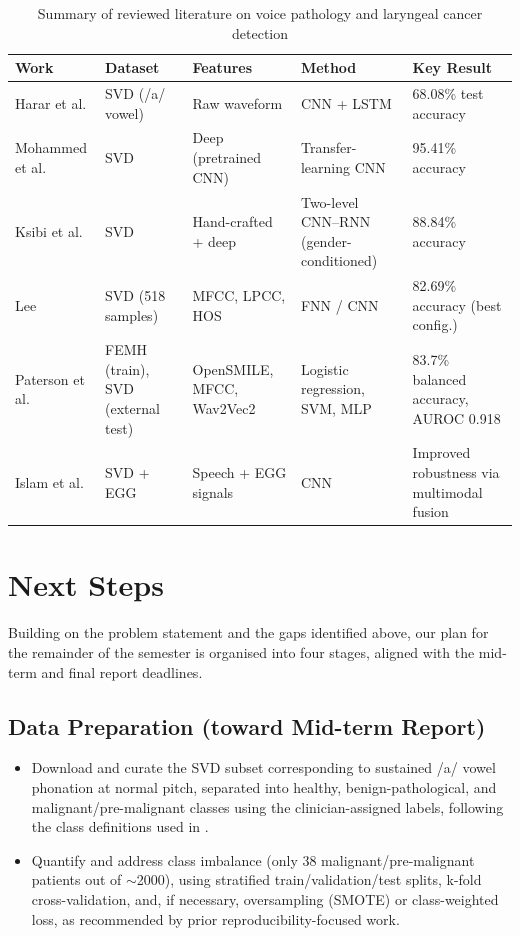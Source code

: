 \documentclass[conference]{IEEEtran}
\begin{document}
\begin{table}[t]
\centering
\caption{Summary of reviewed literature on voice pathology and laryngeal cancer detection}
\label{tab:litsummary}
\begin{tabular}{@{}p{2.6cm}p{2.6cm}p{3.4cm}p{4.4cm}p{2.6cm}@{}}
\toprule
\textbf{Work} & \textbf{Dataset} & \textbf{Features} & \textbf{Method} & \textbf{Key Result} \\
\midrule
Harar et al. \cite{harar2017} & SVD (/a/ vowel) & Raw waveform & CNN + LSTM & 68.08\% test accuracy \\
Mohammed et al. \cite{mohammed2020} & SVD & Deep (pretrained CNN) & Transfer-learning CNN & 95.41\% accuracy \\
Ksibi et al. \cite{ksibi2023} & SVD & Hand-crafted + deep & Two-level CNN--RNN (gender-conditioned) & 88.84\% accuracy \\
Lee \cite{lee2021} & SVD (518 samples) & MFCC, LPCC, HOS & FNN / CNN & 82.69\% accuracy (best config.) \\
Paterson et al. \cite{paterson2024} & FEMH (train), SVD (external test) & OpenSMILE, MFCC, Wav2Vec2 & Logistic regression, SVM, MLP & 83.7\% balanced accuracy, AUROC 0.918 \\
Islam et al. \cite{islam2022} & SVD + EGG & Speech + EGG signals & CNN & Improved robustness via multimodal fusion \\
\bottomrule
\end{tabular}
\end{table}

\section{Next Steps}
\label{sec:nextsteps}

Building on the problem statement and the gaps identified above, our plan for the remainder of the semester is organised into four stages, aligned with the mid-term and final report deadlines.

\subsection{Data Preparation (toward Mid-term Report)}
\begin{itemize}
    \item Download and curate the SVD subset corresponding to sustained /a/ vowel phonation at normal pitch, separated into healthy, benign-pathological, and malignant/pre-malignant classes using the clinician-assigned labels, following the class definitions used in \cite{paterson2024}.
    \item Quantify and address class imbalance (only 38 malignant/pre-malignant patients out of $\sim$2000), using stratified train/validation/test splits, k-fold cross-validation, and, if necessary, oversampling (SMOTE) or class-weighted loss, as recommended by prior reproducibility-focused work.
\end{itemize}
\end{document}
